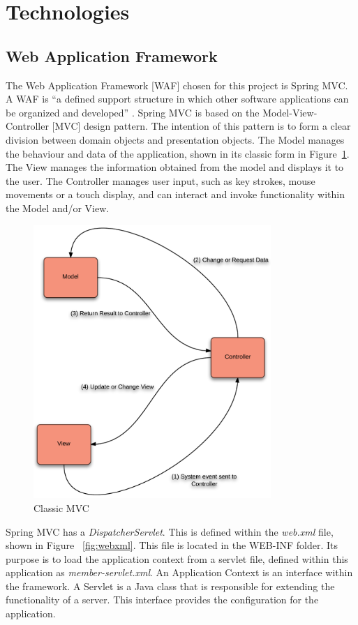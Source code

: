 \section{Technologies}

\subsection{Web Application Framework}
The Web Application Framework [WAF] chosen for this project is Spring MVC. A WAF is “a defined support structure in which other software applications can be organized and developed” \parencite{shan2006taxonomy}. Spring MVC is based on the Model-View-Controller [MVC] design pattern. The intention of this pattern is to form a clear division between domain objects and presentation objects. The Model manages the behaviour and data of the application, shown in its classic form in Figure~\ref{fig:mvcclassic}. The View manages the information obtained from the model and displays it to the user. The Controller manages user input, such as key strokes, mouse movements or a touch display, and can interact and invoke functionality within the Model and/or View.

\begin{figure}[H]
\begin{center}
\includegraphics[width=9cm]{mvcclassic.png}
\end{center}
\caption{Classic MVC}
\label{fig:mvcclassic}
\end{figure}

Spring MVC has a \textit{DispatcherServlet}. This is defined within the \textit{web.xml} file, shown in Figure ~\ref{fig:webxml}. This file is located in the WEB-INF folder. Its purpose is to load the application context from a servlet file, defined within this application as \textit{member-servlet.xml}. An Application Context is an interface within the framework. A Servlet is a Java class that is responsible for extending the functionality of a server. This interface provides the configuration for the application. 

